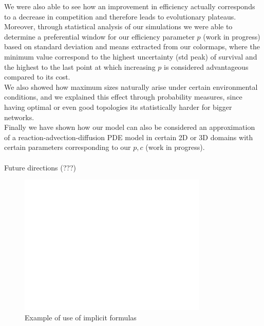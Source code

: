 \documentclass{amsart}
\theoremstyle{plain}
\numberwithin{equation}{section}
\begin{document}
We were also able to see how an improvement in efficiency actually corresponds to a decrease in competition and therefore leads to evolutionary plateaus.\\
Moreover, through statistical analysis of our simulations we were able to determine a preferential window for our efficiency parameter $p$ (work in progress) based on standard deviation and means extracted from our colormaps, where the minimum value correspond to the highest uncertainty (std peak) of survival and the highest to the last point at which increasing $p$ is considered advantageous compared to its cost.\\
We also showed how  maximum sizes naturally arise under certain environmental conditions, and we explained this effect through probability measures, since having optimal or even good topologies its statistically harder for bigger networks.\\
Finally we have shown how our model can also be considered an approximation of a reaction-advection-diffusion PDE model in certain 2D or 3D domains with certain parameters corresponding to our $p,c$ (work in progress).\\
\\
Future directions (???)


\begin{figure}[p]
    \centering
    \includegraphics[width=0.8\textwidth]{untitled.jpg}
    \caption{Example of use of implicit formulas}
    \label{fig1}
\end{figure}
\end{document}
